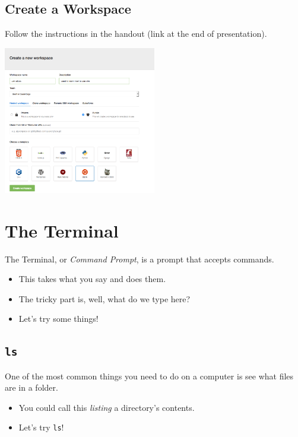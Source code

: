 \documentclass[aspectratio=1610]{beamer}                  %
\newcommand{\srule}{
	\rule{\textwidth}{1pt}\\
}
\newlength{\subsecwidth}
\newenvironment{slide}{
	\begin{frame}                                    %
		\settowidth{\subsecwidth}{\insertsubsection} %
		\ifthenelse{\dimtest{\subsecwidth}{<}{1pt}}{ %
			\frametitle{\huge \insertsection\\             %
				\vspace{-1ex}                            %
			}
		}{                                           %
			\frametitle{\huge \insertsection\ -- \insertsubsection\\ %
				\vspace{-1ex}                            %
			}
		}
		\Large                                       %
	}{
	\end{frame}
}
\begin{document}
\subsection{Create a Workspace}
\begin{slide}
    Follow the instructions in the handout (link at the end of presentation).
\end{slide}
\begin{slide}
    \begin{center}
        \includegraphics[width=0.5\textwidth]{images/workspace1}
    \end{center}
\end{slide}

\section{The Terminal}
\begin{slide}
    The Terminal, or \textit{Command Prompt}, is a prompt that accepts commands.
    \begin{itemize}
        \item This takes what you say and does them.
        \item The tricky part is, well, what do we type here?
        \item Let's try some things!
    \end{itemize}
\end{slide}

\subsection{\texttt{ls}}
\begin{slide}
    One of the most common things you need to do on a computer is see what
    files are in a folder.
    \begin{itemize}
        \item You could call this \textit{listing} a directory's contents.
        \item Let's try \texttt{ls}!
    \end{itemize}
\end{slide}
\end{document}
